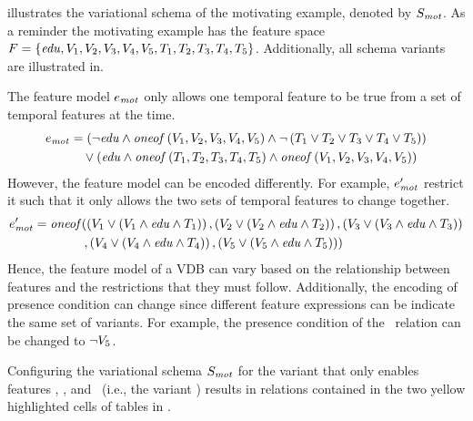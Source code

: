 \begin{example}
\label{eg:vsch-mot}
 illustrates the variational schema of the motivating example, denoted by
$\vSch_\mot$. 
As a reminder the motivating example has the feature space $\features = \setDef {\edu,
\vOne, \vTwo, \vThree, \vFour, \vFive, \tOne, \tTwo, \tThree, \tFour, \tFive}$. Additionally,
all schema variants are illustrated in. 



The feature model $\dimMeta_\mot$ only allows one temporal feature to be true from a set of temporal features at the time. 
\begin{align*}
\dimMeta_\mot &= 
\left( 
\neg \edu \wedge \oneof{
\vOne, \vTwo, \vThree, \vFour, \vFive
}
\wedge \neg \left(\tOne \vee \tTwo \vee \tThree \vee \tFour \vee \tFive
 \right)
\right)\\
&\quad\vee 
\left( \edu \wedge \oneof{
\tOne, \tTwo, \tThree, \tFour, \tFive
} \wedge
\oneof{
\vOne, \vTwo, \vThree, \vFour, \vFive
} \right)
\end{align*}
\noindent
However, the feature model can be encoded differently. For example, $\VVal {\dimMeta_\mot}$ restrict 
it such that it only allows 
the two sets of temporal features to change together.
\begin{align*}
\VVal {\dimMeta_\mot} &= 
\mathit{oneof} (
\left( \vOne \vee \left(\vOne \wedge \edu \wedge \tOne \right) \right)
,
\left( \vTwo \vee \left(\vTwo \wedge \edu \wedge \tTwo \right) \right)
,
\left( \vThree \vee \left(\vThree \wedge \edu \wedge \tThree \right) \right)\\
&\qquad\qquad,
\left( \vFour \vee \left(\vFour \wedge \edu \wedge \tFour \right) \right)
,
\left( \vFive \vee \left(\vFive \wedge \edu \wedge \tFive \right) \right)
)
\end{align*}
\noindent
Hence, the feature model of a VDB can vary based on the relationship between 
features and the restrictions that they must follow.
Additionally, the encoding of presence condition can change since different feature 
expressions can be indicate the same set of variants.
For example, the presence condition of the \job\ relation can be changed to \ensuremath{\neg \vFive}. 

%
Configuring the variational schema $\vSch_\mot$ for the variant that only enables features
\edu, \vTwo, and \tThree\ (i.e., the variant \setDef {\edu, \vTwo, \tThree}) results in 
relations contained in the two yellow highlighted cells of tables in .
\end{example}

